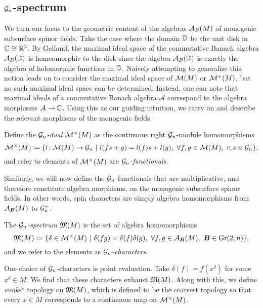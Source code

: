 \subsection{$\mathcal{G}_n$-spectrum}

We turn our focus to the geometric content of the algebras $\mathcal{A}_{B}(M)$ of monogenic subsurface spinor fields. Take the case where the domain $\mathbb{D}$ be the unit disk in $\mathbb{C} \cong \mathbb{R}^2$.  By Gelfand, the maximal ideal space of the commutative Banach algebra $\mathcal{A}_{B}(\mathbb{D})$ is homeomorphic to the disk since the algebra $\mathcal{A}_{B}(\mathbb{D})$ is exactly the algebra of holomorphic functions in $\mathbb{D}$. Naively attempting to generalize this notion leads on to consider the maximal ideal space of $\mathcal{M}^{}(M)$ or $\mathcal{M}^{+}(M)$, but no such maximal ideal space can be determined. Instead, one can note that maximal ideals of a commutative Banach algebra $\mathcal{A}$ correspond to the algebra morphisms $\mathcal{A} \to \mathbb{C}$.  Using this as our guiding intuition, we carry on and describe the relevant morphisms of the monogenic fields.

\begin{definition}
    Define the \emph{$\mathcal{G}_n$-dual} $\mathcal{M}^\times(M)$ as the continuous right $\mathcal{G}_n$-module homomorphisms
    \begin{equation}
        \mathcal{M}^\times(M) \coloneqq \{ l \colon \mathcal{M}(M) \to \mathcal{G}_n ~\vert~ l(fs+g) = l(f)s+l(g), ~\forall f,g \in \mathcal{M}(M), ~r,s \in \mathcal{G}_n \},
    \end{equation}
    and refer to elements of $\mathcal{M}^\times(M)$ are \emph{$\mathcal{G}_n$-functionals}.
\end{definition}
Similarly, we will now define the $\mathcal{G}_n$-functionals that are multiplicative, and therefore constitute algebra morphisms, on the monogenic subsurface spinor fields. In other words, spin characters are simply algebra homomorphisms from $\mathcal{A}_{\boldsymbol{B}}(M)$ to $\mathcal{G}_n^+$.
\begin{definition}
    The \emph{$\mathcal{G}_n$-spectrum} $\mathfrak{M}(M)$ is the set of algebra homomorphisms
    \[
        \mathfrak{M}(M) \coloneqq \{ \delta \in \mathcal{M}^\times(M) ~\vert~ \delta(fg) = \delta(f)\delta(g),~ \forall f,g \in \mathcal{A}_{\boldsymbol{B}}(M),~  \boldsymbol{B} \in \operatorname{Gr}(2,n)\},
    \]
    and we refer to the elements as \emph{$\mathcal{G}_n$-characters}.
\end{definition}
One choice of $\mathcal{G}_n$-characters is point evaluation. Take $\delta(f)=f(x^\delta)$ for some $x^\delta \in M$. We find that these characters exhaust $\mathfrak{M}(M)$. Along with this, we define \emph{weak-$\ast$} topology on $\mathfrak{M}(M)$, which is defined to be the coarsest topology so that every $x \in M$ corresponds to a continuous map on $\mathcal{M}^\times(M)$. 

